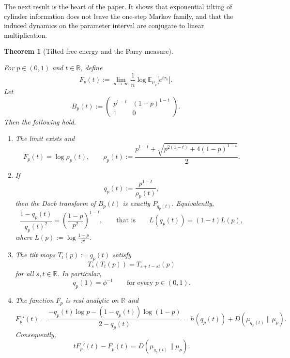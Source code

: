 \documentclass[pdflatex,sn-basic,Numbered]{sn-jnl}
\theoremstyle{thmstyleone}
\newtheorem{theorem}{Theorem}[section]
\theoremstyle{thmstyletwo}
\theoremstyle{thmstylethree}
\newcommand{\RR}{\mathbb{R}}
\newcommand{\EE}{\mathbb{E}}
\newcommand{\leanverified}[1]{}
\begin{document}
The next result is the heart of the paper. It shows that exponential tilting of cylinder information does not leave the one-step Markov family, and that the induced dynamics on the parameter interval are conjugate to linear multiplication.

\begin{theorem}[Tilted free energy and the Parry measure]\label{thm:tilted-free-energy}
\leanverified{paper_zero_jitter_tilted_free_energy}
For $p\in(0,1)$ and $t\in\RR$, define
\[
F_p(t):=\lim_{n\to\infty}\frac{1}{n}\log \EE_{\mu_p}\bigl[e^{t\tau_n}\bigr].
\]
Let
\[
B_p(t):=
\begin{pmatrix}
p^{1-t} & (1-p)^{1-t}\\
1 & 0
\end{pmatrix}.
\]
Then the following hold.
\begin{enumerate}[label=(\roman*),leftmargin=*,itemsep=2pt]
  \item The limit exists and
  \begin{equation}\label{eq:free-energy}
  F_p(t)=\log\rho_p(t),
  \qquad
  \rho_p(t):=
  \frac{p^{1-t}+\sqrt{p^{2(1-t)}+4(1-p)^{1-t}}}{2}.
  \end{equation}
  \item If
  \begin{equation}\label{eq:qpt-definition}
  q_p(t):=\frac{p^{1-t}}{\rho_p(t)},
  \end{equation}
  then the Doob transform of $B_p(t)$ is exactly $P_{q_p(t)}$. Equivalently,
  \begin{equation}\label{eq:defect-coordinate-flow}
  \frac{1-q_p(t)}{q_p(t)^2}
  =
  \left(\frac{1-p}{p^2}\right)^{1-t},
  \qquad\text{that is}\qquad
  L(q_p(t))=(1-t)L(p),
  \end{equation}
  where $L(p):=\log\frac{1-p}{p^2}$.
  \item The tilt maps $T_t(p):=q_p(t)$ satisfy
  \begin{equation}\label{eq:tilt-semigroup}
  T_s(T_t(p))=T_{s+t-st}(p)
  \end{equation}
  for all $s,t\in\RR$. In particular,
  \begin{equation}\label{eq:unit-tilt-parry}
  q_p(1)=\phi^{-1}
  \qquad\text{for every }p\in(0,1).
  \end{equation}
  \item The function $F_p$ is real analytic on $\RR$ and
  \begin{equation}\label{eq:Fprime-cross-entropy}
  F_p'(t)
  =
  \frac{-q_p(t)\log p-(1-q_p(t))\log(1-p)}{2-q_p(t)}
  =
  h(q_p(t))+D(\mu_{q_p(t)}\|\mu_p).
  \end{equation}
  Consequently,
  \begin{equation}\label{eq:relative-entropy-along-tilt}
  tF_p'(t)-F_p(t)=D(\mu_{q_p(t)}\|\mu_p).
  \end{equation}
\end{enumerate}
\end{theorem}
\end{document}
